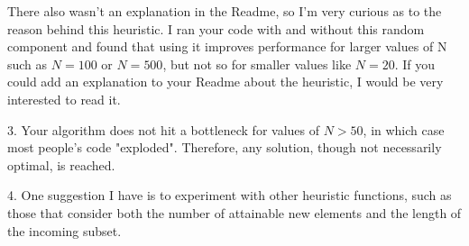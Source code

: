 There also wasn't an explanation in the Readme, so I'm very curious as to the reason behind this heuristic. I ran your code with and without this random component and found that using it improves performance for larger values of N such as $N=100$ or $N=500$, but not so for smaller values like $N=20$. If you could add an explanation to your Readme about the heuristic, I would be very interested to read it.

3. Your algorithm does not hit a bottleneck for values of $N>50$, in which case most people's code "exploded". Therefore, any solution, though not necessarily optimal, is reached.

4. One suggestion I have is to experiment with other heuristic functions, such as those that consider both the number of attainable new elements and the length of the incoming subset.